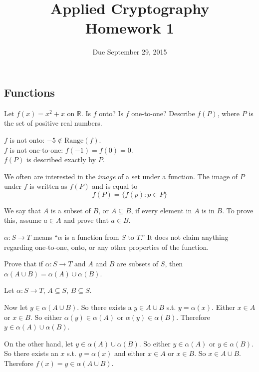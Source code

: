 \documentclass{exam}
\title{Applied Cryptography\\Homework 1}
\date{Due September 29, 2015}
\newcommand{\R}{\mathbb{R}}
\newcommand{\?}{\stackrel{?}{=}}
\begin{document}
\maketitle


\begin{questions}

	\section*{Functions}

	\question 
	Let $f(x) = x^2 + x$ on $\R$. Is $f$ onto? Is $f$ one-to-one? Describe $f(P)$, where $P$ is the set of positive real numbers.
	\begin{solution}
		$f$ is not onto: $-5 \not\in \mathrm{Range}(f)$. \\
		$f$ is not one-to-one: $f(-1) = f(0) = 0$. \\
		$f(P)$ is described exactly by $P$.
	\end{solution}
	
	\begin{mdframed}
		We often are interested in the \textit{image} of a set under a function.
		The image of $P$ under $f$ is written as $f(P)$ and is equal to
		\[ f(P) = \{f(p) : p \in P\} \]
		
		We say that $A$ is a subset of $B$, or $A \subseteq B$, if every element in
		$A$ is in $B$. To prove this, assume $a \in A$ and prove that $a \in B$.

		$\alpha: S \rightarrow T$ means ``$\alpha$ is a function from $S$ to
		$T$.'' It
		does not claim anything regarding one-to-one, onto, or any other properties
		of the function.

	\end{mdframed}

	\question 
	Prove that if $\alpha: S \rightarrow T$ and $A$ and $B$ are subsets of $S$, then $\alpha(A \cup B) = \alpha(A) \cup \alpha(B)$.
	\begin{solution}
		Let $\alpha: S \rightarrow T$, $A \subseteq S$, $B \subseteq S$.

		Now let $y \in \alpha(A \cup B)$. So there exists a $y \in A \cup B$ s.t. $y = \alpha(x)$. Either $x \in A$ or $x \in B$. So either $\alpha(y) \in \alpha(A)$ or $\alpha(y) \in \alpha(B)$. Therefore $y \in \alpha(A) \cup \alpha(B)$.

		On the other hand, let $y \in \alpha(A) \cup \alpha(B)$. So either $y \in \alpha(A)$ or $y \in \alpha(B)$. So there exists an $x$ s.t. $y = \alpha(x)$ and either $x \in A$ or $x \in B$. So $x \in A \cup B$. Therefore $f(x) = y \in \alpha(A \cup B)$.
	\end{solution}


\end{questions}
\end{document}
